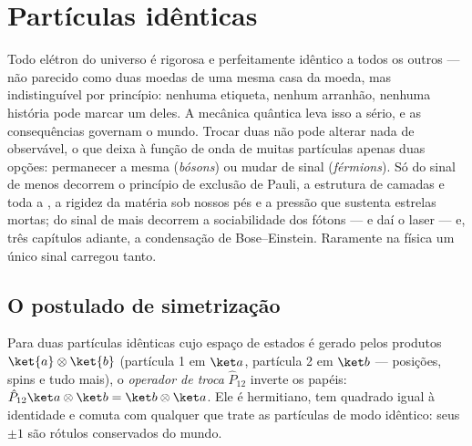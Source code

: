 \chapter{Partículas idênticas}\label{ch:b3:identical-particles}

Todo elétron do universo é rigorosa e perfeitamente idêntico a todos os
outros --- não parecido como duas moedas de uma mesma casa da moeda,
mas indistinguível por princípio: nenhuma etiqueta, nenhum arranhão,
nenhuma história pode marcar um deles. A mecânica quântica leva isso a
sério, e as consequências governam o mundo. Trocar duas  não pode alterar nada de observável, o que deixa à função de
onda de muitas partículas apenas duas opções: permanecer a mesma
(\emph{bósons}) ou mudar de sinal (\emph{férmions}). Só do sinal de
menos decorrem o princípio de exclusão de Pauli, a estrutura de camadas
e toda a , a rigidez da matéria sob nossos pés e a
pressão que sustenta estrelas mortas; do sinal de mais decorrem a
sociabilidade dos fótons --- e daí o laser --- e, três capítulos
adiante, a condensação de Bose--Einstein. Raramente na física um único
sinal carregou tanto.

\section{O postulado de simetrização}

\begin{definition}[Troca]\label{def:b3:identical-particles:exchange}
Para duas partículas idênticas cujo espaço de estados é gerado pelos
produtos $\ket{a}\otimes\ket{b}$ (partícula 1 em $\ket a$, partícula 2
em $\ket b$ --- posições, spins e tudo mais), o \emph{operador de
troca} $\hat P_{12}$ inverte os papéis: $\hat P_{12}\ket a\otimes\ket b =
\ket b\otimes\ket a$. Ele é
hermitiano, tem quadrado igual à identidade e comuta com qualquer
 que trate as partículas de modo idêntico: seus 
$\pm1$ são rótulos conservados do mundo.
\end{definition}

